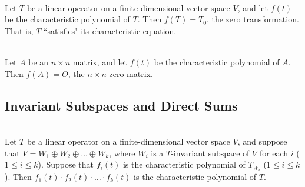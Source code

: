 \begin{theorem}
	\hfill\\
	Let $T$ be a linear operator on a finite-dimensional vector space $V$, and let $f(t)$ be the characteristic polynomial of $T$. Then $f(T) = T_0$, the zero transformation. That is, $T$ ``satisfies" its characteristic equation.
\end{theorem}

\begin{corollary}
	\hfill\\
	Let $A$ be an $n \times n$ matrix, and let $f(t)$ be the characteristic polynomial of $A$. Then $f(A) = O$, the $n \times n$ zero matrix.
\end{corollary}

\subsection*{Invariant Subspaces and Direct Sums}

\begin{theorem}
	\hfill\\
	Let $T$ be a linear operator on a finite-dimensional vector space $V$, and suppose that $V = W_1 \oplus W_2 \oplus \dots \oplus W_k$, where $W_i$ is a $T$-invariant subspace of $V$ for each $i$ ($1 \leq i \leq k$). Suppose that $f_i(t)$ is the characteristic polynomial of $T_{W_i}$ ($1 \leq i \leq k$). Then $f_1(t)\cdot f_2(t) \cdot \dots \cdot f_k(t)$ is the characteristic polynomial of $T$.
\end{theorem}

